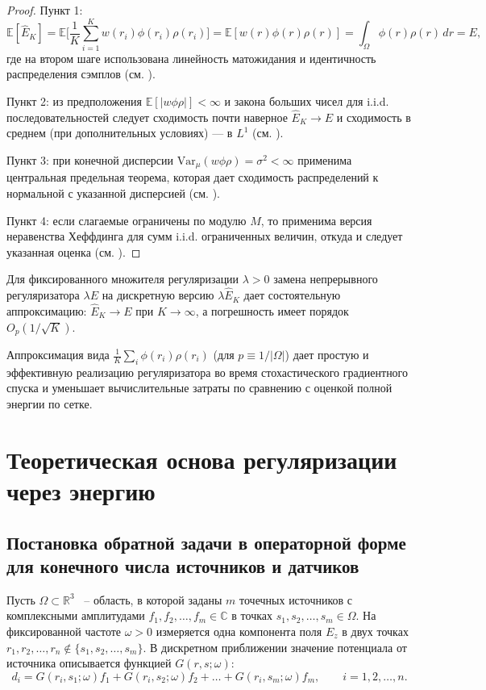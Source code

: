 \documentclass[a4paper,14pt,oneside,openany]{extarticle}
\begin{document}
\begin{proof}
Пункт 1: 
\[ \mathbb{E}[\hat E_K]=\mathbb{E}\Big[\frac{1}{K}\sum_{i=1}^K w(r_i)\phi(r_i)\rho(r_i)\Big]=\mathbb{E}[w(r)\phi(r)\rho(r)]=\int_{\Omega} \phi(r)\rho(r)\,dr=E, \]
где на втором шаге использована линейность матожидания и идентичность распределения сэмплов (см. \cite{Billingsley1995}).

Пункт 2: из предположения $\mathbb{E}[|w\phi\rho|]<\infty$ и закона больших чисел для i.i.d. 
последовательностей следует сходимость почти наверное $\hat E_K\to E$ и сходимость в среднем 
(при дополнительных условиях) --- в $L^1$ (см. \cite{Billingsley1995}).

Пункт 3: при конечной дисперсии $\mathrm{Var}_\mu(w\phi\rho)=\sigma^2<\infty$ применима центральная 
предельная теорема, которая дает сходимость распределений к нормальной с указанной дисперсией 
(см. \cite{VanDerVaart1998}).

Пункт 4: если слагаемые ограничены по модулю $M$, то применима версия неравенства Хеффдинга для 
сумм i.i.d. ограниченных величин, откуда и следует указанная оценка (см. \cite{Hoeffding1963}).
\end{proof}


Для фиксированного множителя регуляризации $\lambda>0$ замена непрерывного регуляризатора 
$\lambda E$ на дискретную версию $\lambda\hat E_K$ дает состоятельную аппроксимацию: $\hat E_K\to E$ при $K\to\infty$, а погрешность имеет порядок $O_p(1/\sqrt{K})$.


\begin{remark}
Аппроксимация вида $\frac{1}{K}\sum_i\phi(r_i)\rho(r_i)$ (для $p\equiv 1/|\Omega|$) дает простую 
и эффективную реализацию регуляризатора во время стохастического градиентного спуска и уменьшает 
вычислительные затраты по сравнению с оценкой полной энергии по сетке.
\end{remark}

\newpage
\section{Теоретическая основа регуляризации через энергию}
\subsection{Постановка обратной задачи в операторной форме для конечного числа источников и датчиков}

Пусть $\Omega\subset\mathbb{R}^3$ ~-- область, в которой заданы $m$ точечных источников с комплексными 
амплитудами $f_1, f_2, \dots, f_m\in\mathbb{C}$ в точках $s_1, s_2, \dots, s_m\in\Omega$. 
На фиксированной частоте $\omega>0$ измеряется одна компонента поля $E_z$ в двух точках 
$r_1, r_2, \dots, r_n \notin\{s_1, s_2, \dots, s_m\}$. В дискретном приближении значение потенциала 
от источника описывается функцией $G(r,s;\omega)$:
\begin{equation}\label{eq:direct_em}
    d_i = G(r_i,s_1;\omega) f_1 + G(r_i,s_2;\omega) f_2 + \dots + G(r_i,s_m;\omega) f_m,
    \qquad i=1,2, \dots, n.
\end{equation}
\end{document}
